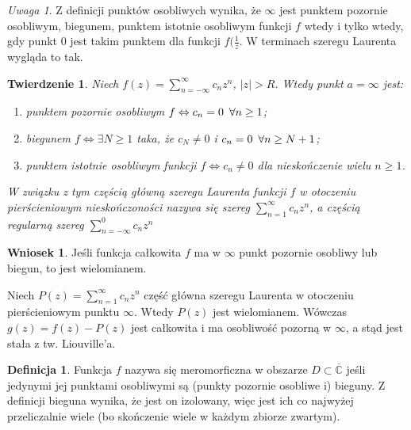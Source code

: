 \documentclass[11pt]{article}
\newcommand{\abs}[1]{\left|#1\right|} %
\newcommand{\extcomplex}{\overline{\mathbb{C}}} %
\theoremstyle{plain}
\newtheorem*{theorem}{Twierdzenie}
\theoremstyle{definition}
\newtheorem*{definition}{Definicja}
\newtheorem*{corollary}{Wniosek}
\theoremstyle{remark}
\newtheorem*{remark}{Uwaga}
\let\oldendproof\endproof
\renewenvironment{proof}[1][\proofname]{
  \oldproof[\textsc{\small #1}]
}{\oldendproof}
\begin{document}
\begin{remark}
  Z definicji punktów osobliwych wynika, że $ \infty $ jest punktem pozornie osobliwym, biegunem, punktem istotnie osobliwym funkcji $f$ wtedy i tylko wtedy,
  gdy punkt $0$ jest takim punktem dla funkcji $ f(\frac{1}{z} $. W terminach szeregu Laurenta wygląda to tak.
\end{remark}

\begin{theorem}
  Niech $ f(z) = \sum_{n=-\infty}^{\infty} c_n z^n $, $ \abs{z} > R $.
  Wtedy punkt $ a = \infty $ jest:
  \begin{enumerate}
    \item punktem pozornie osobliwym $ f \Leftrightarrow c_n = 0 \enskip\forall n \geq 1 $; \label{osobliwy-infty-poz}
    \item biegunem $ f \Leftrightarrow \exists N \geq 1 $ taka, że $ c_N \neq 0 $ i $ c_n = 0 \enskip\forall n \geq N + 1 $; \label{osobliwy-infty-bieg}
    \item  punktem istotnie osobliwym funkcji $ f \Leftrightarrow c_n \neq 0 $ dla nieskończenie wielu $ n \geq 1 $. \label{osobliwy-infty-ist}
  \end{enumerate}
  W związku z tym częścią główną szeregu Laurenta funkcji $ f $ w otoczeniu pierścieniowym nieskończoności nazywa się szereg $ \sum_{n=1}^{\infty} c_n z^n $, a częścią regularną szereg $ \sum_{n=-\infty}^{0} c_n z^n $
\end{theorem}

\begin{corollary}
  Jeśli funkcja całkowita $f$ ma w $ \infty $ punkt pozornie osobliwy lub biegun, to jest wielomianem.
\end{corollary}

\begin{proof}
  Niech $ P(z) = \sum_{n=1}^{\infty} c_n z^n $ część główna szeregu Laurenta w otoczeniu pierścieniowym punktu $ \infty $.
  Wtedy $ P(z) $ jest wielomianem.
  Wówczas $ g(z) = f(z) - P(z) $ jest całkowita i ma osobliwość pozorną w $ \infty $,
  a stąd jest stała z tw. Liouville'a.
\end{proof}

\begin{definition}
  Funkcja $f$ nazywa się meromorficzna w obszarze $ D \subset \extcomplex $ jeśli jedynymi jej punktami osobliwymi są (punkty pozornie osobliwe i) bieguny.
  Z definicji bieguna wynika, że jest on izolowany, więc jest ich co najwyżej przeliczalnie wiele (bo skończenie wiele w każdym zbiorze zwartym).
\end{definition}
\end{document}
